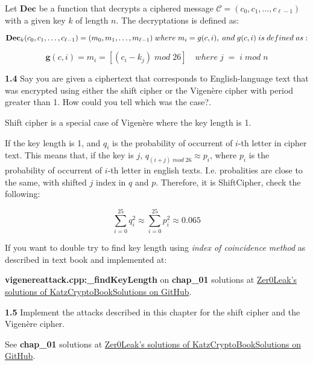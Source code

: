 Let \(\textbf{Dec}\) be a function that decrypts a ciphered message \( \mathcal{C} = (c_0, c_1, \dots, c_{\ell-1}) \) with a given key \( k \) of length \(n\). The decryptations is defined as:

\[
\textbf{Dec\( _k\)}(c_0, c_1, \dots, c_{\ell-1}) = (m_0, m_1, \dots, m_{\ell-1}) \; where \; m_i = g(c, i),\; and \; g(c, i) \;is\;defined\;as:
\]

\[
\textbf{g}(c, i) = m_i = [(c_i - k_j) \; mod \;26] \quad where \; j \; = \; i \; mod \; n
\]

\vspace{1em}
\noindent
\textbf{1.4} \hspace{1em} Say you are given a ciphertext that corresponds to English-language text that was encrypted using either the shift cipher or the Vigenère cipher with period greater than 1. How could you tell which was the case?.
\vspace{1em}

Shift cipher is a special case of Vigenère where the key length is 1.

If the key length is 1, and \( q_i \) is the probability of occurrent of $i$-th letter in cipher text. This means that, if the key is \( j \),  \( q_{(i + j)\;mod\;26} \approx  p_i \), where \(p_i\) is the probability of occurrent of $i$-th letter in english texts. I.e. probalities are close to the same, with shifted \(j\) index in \(q\) and \(p\). Therefore, it is ShiftCipher, check the following:

\[
\sum_{i=0}^{25} q_i^2 \approx \sum_{i=0}^{25} p_i^2 \approx 0.065
\]

If you want to double try to find key length using \textit{index of coincidence method} as described in text book and implemented at:

\textbf{vigenereattack.cpp:\_findKeyLength} on \textbf{chap\_01} solutions at \href{https://github.com/Zer0Leak/KatzCryptoBookSolutions/blob/main/chap01/qt_project/vigenereattack.cpp}{Zer0Leak's solutions of KatzCryptoBookSolutions on GitHub}.

\vspace{1em}
\noindent
\textbf{1.5} \hspace{1em} Implement the attacks described in this chapter for the shift cipher and
the Vigenère cipher.
\vspace{1em}

See \textbf{chap\_01} solutions at \href{https://github.com/Zer0Leak/KatzCryptoBookSolutions/blob/main/chap01/qt_project/}{Zer0Leak's solutions of KatzCryptoBookSolutions on GitHub}.

